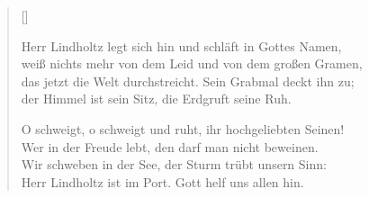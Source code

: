 \settowidth{\versewidth}{Herr Lindholtz legt sich hin und schläft in Gottes Namen,}
\begin{verse}[\versewidth]

 Herr Lindholtz legt sich hin und schläft in Gottes Namen,\\
weiß nichts mehr von dem Leid und von dem großen Gramen,\\
das jetzt die Welt durchstreicht. Sein Grabmal deckt ihn zu;\\
der Himmel ist sein Sitz, die Erdgruft seine Ruh.

 O schweigt, o schweigt und ruht, ihr hochgeliebten Seinen!\\
Wer in der Freude lebt, den darf man nicht beweinen.\\
Wir schweben in der See, der Sturm trübt unsern Sinn:\\
Herr Lindholtz ist im Port. Gott helf uns allen hin.

\end{verse}
